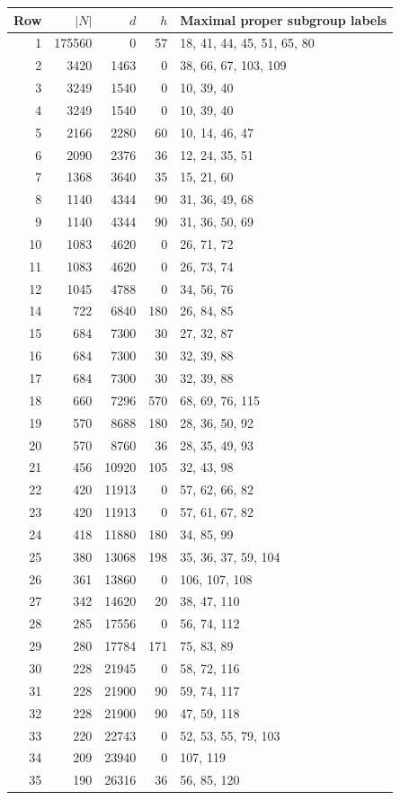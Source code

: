 \documentclass[10pt,a4paper]{article}
\begin{document}
\small
\begin{longtable}{r r r r p{57mm}}
\toprule Row&$|N|$&$d$&$h$&Maximal proper subgroup labels\\\midrule\endhead
1&175560&0&57&18, 41, 44, 45, 51, 65, 80\\
2&3420&1463&0&38, 66, 67, 103, 109\\
3&3249&1540&0&10, 39, 40\\
4&3249&1540&0&10, 39, 40\\
5&2166&2280&60&10, 14, 46, 47\\
6&2090&2376&36&12, 24, 35, 51\\
7&1368&3640&35&15, 21, 60\\
8&1140&4344&90&31, 36, 49, 68\\
9&1140&4344&90&31, 36, 50, 69\\
10&1083&4620&0&26, 71, 72\\
11&1083&4620&0&26, 73, 74\\
12&1045&4788&0&34, 56, 76\\
14&722&6840&180&26, 84, 85\\
15&684&7300&30&27, 32, 87\\
16&684&7300&30&32, 39, 88\\
17&684&7300&30&32, 39, 88\\
18&660&7296&570&68, 69, 76, 115\\
19&570&8688&180&28, 36, 50, 92\\
20&570&8760&36&28, 35, 49, 93\\
21&456&10920&105&32, 43, 98\\
22&420&11913&0&57, 62, 66, 82\\
23&420&11913&0&57, 61, 67, 82\\
24&418&11880&180&34, 85, 99\\
25&380&13068&198&35, 36, 37, 59, 104\\
26&361&13860&0&106, 107, 108\\
27&342&14620&20&38, 47, 110\\
28&285&17556&0&56, 74, 112\\
29&280&17784&171&75, 83, 89\\
30&228&21945&0&58, 72, 116\\
31&228&21900&90&59, 74, 117\\
32&228&21900&90&47, 59, 118\\
33&220&22743&0&52, 53, 55, 79, 103\\
34&209&23940&0&107, 119\\
35&190&26316&36&56, 85, 120\\

\end{longtable}
\end{document}
